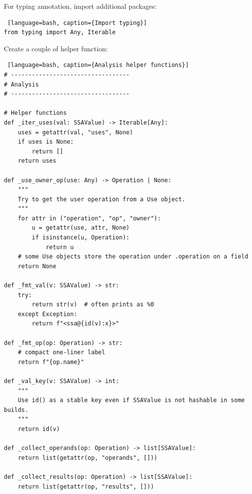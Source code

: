 \documentclass[../main.tex]{subfiles}
\begin{document}
For typing annotation, import additional packages:
\begin{lstlisting} [language=bash, caption={Import typing}]
from typing import Any, Iterable
\end{lstlisting}
Create a couple of helper function:
\begin{lstlisting} [language=bash, caption={Analysis helper functions}]
# ----------------------------------
# Analysis
# ----------------------------------

# Helper functions
def _iter_uses(val: SSAValue) -> Iterable[Any]:
    uses = getattr(val, "uses", None)
    if uses is None:
        return []
    return uses

def _use_owner_op(use: Any) -> Operation | None:
    """
    Try to get the user operation from a Use object.
    """
    for attr in ("operation", "op", "owner"):
        u = getattr(use, attr, None)
        if isinstance(u, Operation):
            return u
    # some Use objects store the operation under .operation on a field
    return None

def _fmt_val(v: SSAValue) -> str:
    try:
        return str(v)  # often prints as %0
    except Exception:
        return f"<ssa@{id(v):x}>"

def _fmt_op(op: Operation) -> str:
    # compact one-liner label
    return f"{op.name}"

def _val_key(v: SSAValue) -> int:
    """
    Use id() as a stable key even if SSAValue is not hashable in some builds.
    """
    return id(v)

def _collect_operands(op: Operation) -> list[SSAValue]:
    return list(getattr(op, "operands", []))

def _collect_results(op: Operation) -> list[SSAValue]:
    return list(getattr(op, "results", []))
\end{lstlisting}
\end{document}
